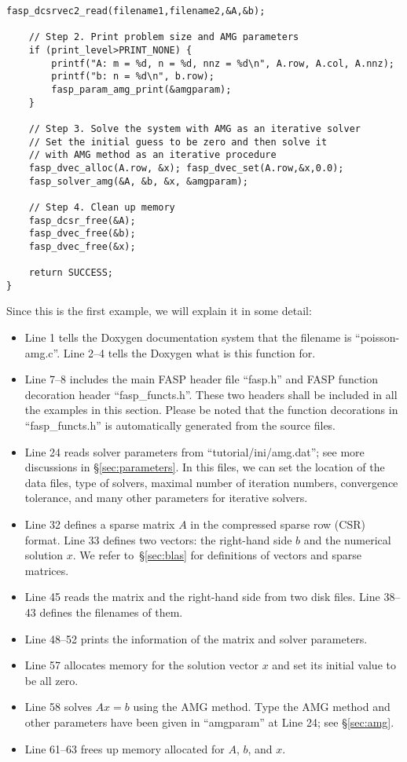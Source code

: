 \documentclass[11pt]{memoir}
\begin{document}
\begin{lstlisting}[stepnumber=1,firstnumber=1]
    fasp_dcsrvec2_read(filename1,filename2,&A,&b);

    // Step 2. Print problem size and AMG parameters
    if (print_level>PRINT_NONE) {
        printf("A: m = %d, n = %d, nnz = %d\n", A.row, A.col, A.nnz);
        printf("b: n = %d\n", b.row);
        fasp_param_amg_print(&amgparam);
    }

    // Step 3. Solve the system with AMG as an iterative solver
    // Set the initial guess to be zero and then solve it
    // with AMG method as an iterative procedure
    fasp_dvec_alloc(A.row, &x); fasp_dvec_set(A.row,&x,0.0);
    fasp_solver_amg(&A, &b, &x, &amgparam);

    // Step 4. Clean up memory
    fasp_dcsr_free(&A);
    fasp_dvec_free(&b);
    fasp_dvec_free(&x);

    return SUCCESS;
}
\end{lstlisting}
%
Since this is the first example, we will explain it in some detail:
\begin{itemize}
%
\item Line 1 tells the Doxygen documentation system that the filename is ``poisson-amg.c''. Line 2--4 tells the Doxygen what is this function for.
%
\item Line 7--8 includes the main FASP header file ``fasp.h'' and FASP function decoration header ``fasp\_functs.h''. These two headers shall be included in all the examples in this section. Please be noted that the function decorations in ``fasp\_functs.h'' is automatically generated from the source files.
%
\item Line 24 reads solver parameters from ``tutorial/ini/amg.dat''; see more discussions in \S\ref{sec:parameters}. In this files, we can set the location of the data files, type of solvers, maximal number of iteration numbers, convergence tolerance, and many other parameters for iterative solvers.
%
\item Line 32 defines a sparse matrix $A$ in the compressed sparse row (CSR) format. Line 33 defines two vectors: the right-hand side $b$ and the numerical solution $x$. We refer to~\S\ref{sec:blas} for definitions of vectors and sparse matrices.
%
\item Line 45 reads the matrix and the right-hand side from two disk files. Line 38--43 defines the filenames of them.
%
\item Line 48--52 prints the information of the matrix and solver parameters.
%
\item Line 57 allocates memory for the solution vector $x$ and set its initial value to be all zero.
%
\item Line 58 solves $Ax=b$ using the AMG method. Type the AMG method and other parameters have been given in ``amgparam'' at Line 24; see \S\ref{sec:amg}.
%
\item Line 61--63 frees up memory allocated for $A$, $b$, and $x$.
\end{itemize}
\end{document}
